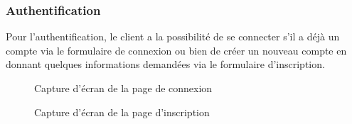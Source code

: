 \subsubsection{Authentification}
Pour l'authentification, le client a la possibilité de se connecter s'il a déjà un compte via le formulaire de connexion ou bien de créer un nouveau compte en donnant quelques informations demandées via le formulaire d'inscription.
\begin{figure}[H]
    \centering
    \caption{Capture d'écran de la page de connexion}
\end{figure}
\begin{figure}[H]
    \centering
    \caption{Capture d'écran de la page d'inscription}
\end{figure}
\newpage
